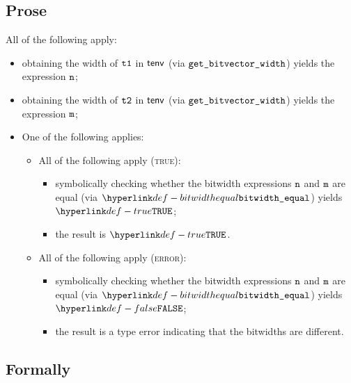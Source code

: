 \subsection{Prose}
All of the following apply:
\begin{itemize}
  \item obtaining the width of $\texttt{t1}$ in $\textsf{tenv}$ (via $\texttt{get\_bitvector\_width}$) yields the expression $\texttt{n}$\ProseOrTypeError;
  \item obtaining the width of $\texttt{t2}$ in $\textsf{tenv}$ (via $\texttt{get\_bitvector\_width}$) yields the expression $\texttt{m}$\ProseOrTypeError;
  \item One of the following applies:
  \begin{itemize}
    \item All of the following apply (\textsc{true}):
    \begin{itemize}
      \item symbolically checking whether the bitwidth expressions $\texttt{n}$ and $\texttt{m}$ are equal (via $\bitwidthequal$) yields $\True$;
      \item the result is $\True$.
    \end{itemize}

    \item All of the following apply (\textsc{error}):
    \begin{itemize}
      \item symbolically checking whether the bitwidth expressions $\texttt{n}$ and $\texttt{m}$ are equal (via $\bitwidthequal$) yields $\False$;
      \item the result is a type error indicating that the bitwidths are different.
    \end{itemize}
  \end{itemize}
\end{itemize}

\subsection{Formally}

